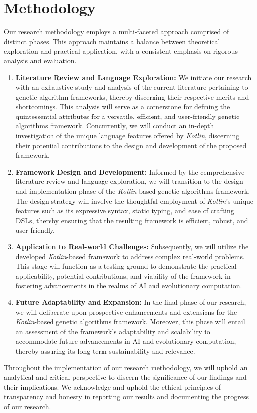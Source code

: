 \section{Methodology}
\label{sec:methodology}
  Our research methodology employs a multi-faceted approach comprised of 
  distinct phases.
  This approach maintains a balance between theoretical exploration and 
  practical application, with a consistent emphasis on rigorous analysis and 
  evaluation.
  
  \begin{enumerate}
    \item \textbf{Literature Review and Language Exploration:} We initiate our 
      research with an exhaustive study and analysis of the current literature 
      pertaining to genetic algorithm frameworks, thereby discerning their 
      respective merits and shortcomings.
      This analysis will serve as a cornerstone for defining the quintessential 
      attributes for a versatile, efficient, and user-friendly genetic 
      algorithms framework.
      Concurrently, we will conduct an in-depth investigation of the unique 
      language features offered by \textit{Kotlin}, discerning their potential 
      contributions to the design and development of the proposed framework.
    \item \textbf{Framework Design and Development:} Informed by the 
      comprehensive literature review and language exploration, we will 
      transition to the design and implementation phase of the 
      \textit{Kotlin}-based genetic algorithms framework.
      The design strategy will involve the thoughtful employment of 
      \textit{Kotlin}'s unique features such as its expressive syntax, static 
      typing, and ease of crafting DSLs, thereby ensuring that the resulting 
      framework is efficient, robust, and user-friendly.
    \item \textbf{Application to Real-world Challenges:} Subsequently, we will 
      utilize the developed \textit{Kotlin}-based framework to address complex 
      real-world problems.
      This stage will function as a testing ground to demonstrate the practical 
      applicability, potential contributions, and viability of the framework in 
      fostering advancements in the realms of AI and evolutionary computation.
    \item \textbf{Future Adaptability and Expansion:} In the final phase of our 
      research, we will deliberate upon prospective enhancements and extensions 
      for the \textit{Kotlin}-based genetic algorithms framework.
      Moreover, this phase will entail an assessment of the framework's 
      adaptability and scalability to accommodate future advancements in AI and 
      evolutionary computation, thereby assuring its long-term sustainability 
      and relevance.
  \end{enumerate}

  Throughout the implementation of our research methodology, we will uphold an 
  analytical and critical perspective to discern the significance of our 
  findings and their implications.
  We acknowledge and uphold the ethical principles of transparency and honesty 
  in reporting our results and documenting the progress of our research.
